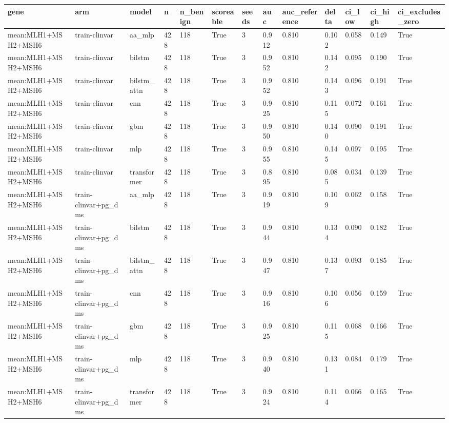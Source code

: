 \begin{table}[t]
\centering
\small
\begin{tabular}{lllllllllllll}
\toprule
gene & arm & model & n & n\_benign & scoreable & seeds & auc & auc\_reference & delta & ci\_low & ci\_high & ci\_excludes\_zero \\
\midrule
mean:MLH1+MSH2+MSH6 & train-clinvar & aa\_mlp & 428 & 118 & True & 3 & 0.912 & 0.810 & 0.102 & 0.058 & 0.149 & True \\
mean:MLH1+MSH2+MSH6 & train-clinvar & bilstm & 428 & 118 & True & 3 & 0.952 & 0.810 & 0.142 & 0.095 & 0.190 & True \\
mean:MLH1+MSH2+MSH6 & train-clinvar & bilstm\_attn & 428 & 118 & True & 3 & 0.952 & 0.810 & 0.143 & 0.096 & 0.191 & True \\
mean:MLH1+MSH2+MSH6 & train-clinvar & cnn & 428 & 118 & True & 3 & 0.925 & 0.810 & 0.115 & 0.072 & 0.161 & True \\
mean:MLH1+MSH2+MSH6 & train-clinvar & gbm & 428 & 118 & True & 3 & 0.950 & 0.810 & 0.140 & 0.090 & 0.191 & True \\
mean:MLH1+MSH2+MSH6 & train-clinvar & mlp & 428 & 118 & True & 3 & 0.955 & 0.810 & 0.145 & 0.097 & 0.195 & True \\
mean:MLH1+MSH2+MSH6 & train-clinvar & transformer & 428 & 118 & True & 3 & 0.895 & 0.810 & 0.085 & 0.034 & 0.139 & True \\
mean:MLH1+MSH2+MSH6 & train-clinvar+pg\_dms & aa\_mlp & 428 & 118 & True & 3 & 0.919 & 0.810 & 0.109 & 0.062 & 0.158 & True \\
mean:MLH1+MSH2+MSH6 & train-clinvar+pg\_dms & bilstm & 428 & 118 & True & 3 & 0.944 & 0.810 & 0.134 & 0.090 & 0.182 & True \\
mean:MLH1+MSH2+MSH6 & train-clinvar+pg\_dms & bilstm\_attn & 428 & 118 & True & 3 & 0.947 & 0.810 & 0.137 & 0.093 & 0.185 & True \\
mean:MLH1+MSH2+MSH6 & train-clinvar+pg\_dms & cnn & 428 & 118 & True & 3 & 0.916 & 0.810 & 0.106 & 0.056 & 0.159 & True \\
mean:MLH1+MSH2+MSH6 & train-clinvar+pg\_dms & gbm & 428 & 118 & True & 3 & 0.925 & 0.810 & 0.115 & 0.068 & 0.166 & True \\
mean:MLH1+MSH2+MSH6 & train-clinvar+pg\_dms & mlp & 428 & 118 & True & 3 & 0.940 & 0.810 & 0.131 & 0.084 & 0.179 & True \\
mean:MLH1+MSH2+MSH6 & train-clinvar+pg\_dms & transformer & 428 & 118 & True & 3 & 0.924 & 0.810 & 0.114 & 0.066 & 0.165 & True \\

\end{tabular}
\end{table}
